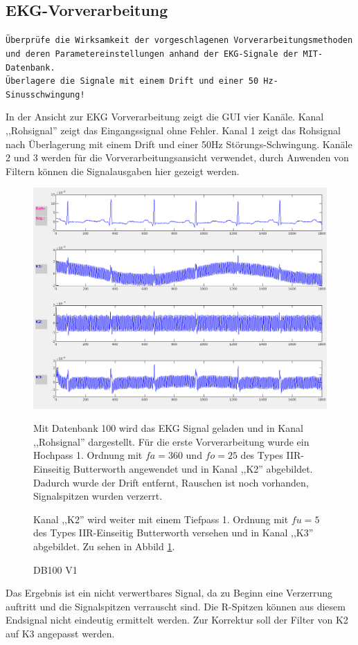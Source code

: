 \documentclass[a4paper,12pt,titlepage]{scrartcl}
\begin{document}
\cleardoublepage
\subsection{EKG-Vorverarbeitung}\label{EKG-Vorverarbeitung}
\texttt{Überprüfe die Wirksamkeit der vorgeschlagenen Vorverarbeitungsmethoden und deren Parametereinstellungen anhand der EKG-Signale der MIT-Datenbank.\\ Überlagere die Signale mit einem Drift und einer 50 Hz-Sinusschwingung!}

In der Ansicht zur EKG Vorverarbeitung zeigt die GUI vier Kanäle. Kanal ,,Rohsignal'' zeigt das Eingangssignal ohne Fehler. Kanal 1 zeigt das Rohsignal nach Überlagerung mit einem Drift und einer 50Hz Störungs-Schwingung. Kanäle 2 und 3 werden für die Vorverarbeitungsansicht verwendet, durch Anwenden von Filtern können die Signalausgaben hier gezeigt werden.

\begin{figure}[ht]
    \begin{minipage}[t]{0.5\linewidth}
        \centering
        \includegraphics[width=0.9\linewidth, valign=t]{Assets/LaborBMT-15-20-37.png}
        \caption{DB100 V1}
        \label{db100v1}
    \end{minipage}%
    \begin{minipage}[t]{0.5\linewidth}
        Mit Datenbank 100 wird das EKG Signal geladen und in Kanal ,,Rohsignal'' dargestellt. Für die erste Vorverarbeitung wurde ein Hochpass 1. Ordnung mit $fa=360$ und $fo=25$ des Types IIR-Einseitig Butterworth angewendet und in Kanal ,,K2'' abgebildet. Dadurch wurde der Drift entfernt, Rauschen ist noch vorhanden, Signalspitzen wurden verzerrt.

        Kanal ,,K2'' wird weiter mit einem Tiefpass 1. Ordnung mit $fu=5$ des Types IIR-Einseitig Butterworth versehen und in Kanal ,,K3'' abgebildet.
        Zu sehen in Abbild \ref{db100v1}.
    \end{minipage}
\end{figure}
Das Ergebnis ist ein nicht verwertbares Signal, da zu Beginn eine Verzerrung auftritt und die Signalspitzen verrauscht sind. Die R-Spitzen können aus diesem Endsignal nicht eindeutig ermittelt werden. Zur Korrektur soll der Filter von K2 auf K3 angepasst werden.
\end{document}
